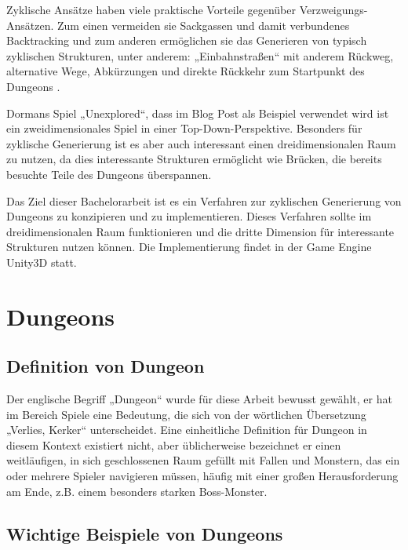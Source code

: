 Zyklische Ansätze haben viele praktische Vorteile gegenüber Verzweigungs-Ansätzen. Zum einen vermeiden sie Sackgassen und damit verbundenes Backtracking und zum anderen ermöglichen sie das Generieren von typisch zyklischen Strukturen, unter anderem: „Einbahnstraßen“ mit anderem Rückweg, alternative Wege, Abkürzungen und direkte Rückkehr zum Startpunkt des Dungeons 
\cite{blogCyclic}.

Dormans Spiel „Unexplored“, dass im Blog Post als Beispiel verwendet wird ist ein zweidimensionales Spiel in einer Top-Down-Perspektive. Besonders für zyklische Generierung ist es aber auch interessant einen dreidimensionalen Raum zu nutzen, da dies interessante Strukturen ermöglicht wie Brücken, die bereits besuchte Teile des Dungeons überspannen.  

Das Ziel dieser Bachelorarbeit ist es ein Verfahren zur zyklischen Generierung von Dungeons zu konzipieren und zu implementieren. Dieses Verfahren sollte im dreidimensionalen Raum funktionieren und die dritte Dimension für interessante Strukturen nutzen können. Die Implementierung findet in der Game Engine Unity3D statt.


\section{Dungeons}
\subsection{Definition von Dungeon}

Der englische Begriff „Dungeon“ wurde für diese Arbeit bewusst gewählt, er hat im Bereich Spiele eine Bedeutung, die sich von der wörtlichen Übersetzung „Verlies, Kerker“ unterscheidet. Eine einheitliche Definition für Dungeon in diesem Kontext existiert nicht, aber üblicherweise bezeichnet er einen weitläufigen, in sich geschlossenen Raum gefüllt mit Fallen und Monstern, das ein oder mehrere Spieler navigieren müssen, häufig mit einer großen Herausforderung am Ende, z.B. einem besonders starken Boss-Monster.


\subsection{Wichtige Beispiele von Dungeons}

